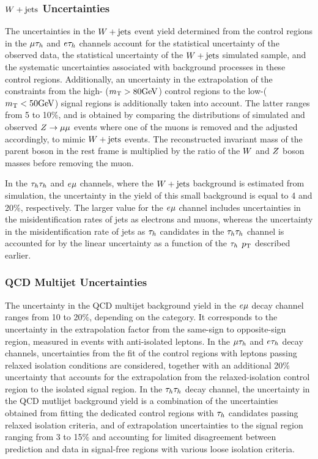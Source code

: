 \subsubsection{$W+\text{jets}$ Uncertainties}
The uncertainties in the $W+\text{jets}$ event yield determined from the control regions in the $\mu\tau_{h}$ and 
$e\tau_{h}$ channels account for the statistical uncertainty of the observed data, the statistical uncertainty of the 
$W+\text{jets}$ simulated sample, and the systematic uncertainties associated with background processes in these 
control regions. Additionally, an uncertainty in the extrapolation  of the constraints from the high-\MT 
($m_\mathrm{T}>80\mathrm{GeV}$) control regions to the low-\MT ($m_\mathrm{T}<50\mathrm{GeV}$) signal regions is additionally taken into account. 
The latter ranges from 5 to 10\%, and is obtained by comparing the \MT distributions of simulated and observed 
$Z\to\mu\mu$ events where one of the muons is removed and the \etvecmiss adjusted accordingly, to mimic 
$W+\text{jets}$ events. The reconstructed invariant mass of the parent boson in the rest frame is multiplied by the 
ratio of the $W$ and $Z$ boson masses before removing the muon.

In the $\tau_{h}\tau_{h}$ and $e\mu$ channels, where the $W+\text{jets}$ background is estimated from simulation, the 
uncertainty in the yield of this small background is equal to 4 and 20\%, respectively. The larger value for the 
$e\mu$ channel includes uncertainties in the misidentification rates of jets as electrons and muons, whereas the 
uncertainty in the misidentification rate of jets as $\tau_{h}$ candidates in the $\tau_{h}\tau_{h}$ channel is accounted for 
by the linear uncertainty as a function of the $\tau_{h}$ $p_\mathrm{T}$ described earlier.

\subsubsection{QCD Multijet Uncertainties}
The uncertainty in the QCD multijet background yield in the $e\mu$ decay channel ranges from 10 to 20\%, depending 
on the category. It corresponds to the uncertainty in the extrapolation factor from the same-sign to opposite-sign 
region, measured in events with anti-isolated leptons. In the $\mu\tau_{h}$ and $e\tau_{h}$ decay channels, uncertainties from 
the fit of the control regions with leptons passing relaxed isolation conditions are
considered, together with an additional 20\% uncertainty that accounts for the extrapolation from the relaxed-isolation 
control region to the isolated signal region.
In the $\tau_{h}\tau_{h}$ decay channel, the uncertainty in the QCD mutlijet background yield is a combination of the 
uncertainties obtained from fitting the dedicated control regions with $\tau_{h}$ candidates passing relaxed isolation 
criteria, and of extrapolation uncertainties to the signal region ranging from 3 to 15\% and accounting for limited 
disagreement between prediction and data in signal-free regions with various loose isolation criteria.

